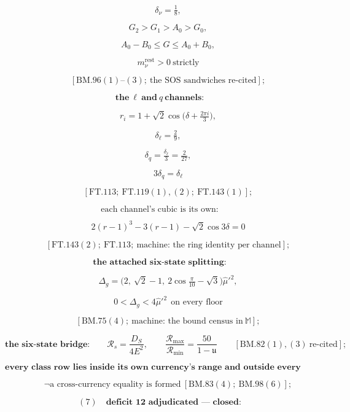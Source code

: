 \documentclass[11pt,openany]{report}
\theoremstyle{canonplain}
\theoremstyle{canondef}
\begin{document}
\[
\qquad \delta_\nu=\tfrac18,
\]

\[
\qquad G_2>G_1>A_0>G_0,
\]

\[
\qquad A_0-B_0\le G\le A_0+B_0,
\]

\[
\qquad m_\nu^{\mathrm{rest}}>0\ \text{strictly}
\]

\[
\qquad [\mathrm{BM.96}(1)\text{--}(3);\ \text{the SOS sandwiches re-cited}];
\]

\[
\textbf{the}\ \ell\ \textbf{and}\ q\ \textbf{channels:}
\]

\[
\qquad r_i=1+\sqrt2\cos\bigl(\delta+\tfrac{2\pi i}3\bigr),
\]

\[
\qquad \delta_\ell=\tfrac29,
\]

\[
\qquad \delta_q=\tfrac{\delta_\ell}3=\tfrac{2}{27},
\]

\[
\qquad 3\delta_q=\delta_\ell
\]

\[
\qquad [\mathrm{FT.113};\ \mathrm{FT.119}(1),(2);\ \mathrm{FT.143}(1)];
\]

\[
\text{each channel's cubic is its own:}
\]

\[
\qquad 2(r-1)^3-3(r-1)-\sqrt2\cos3\delta=0
\]

\[
\qquad [\mathrm{FT.143}(2);\ \mathrm{FT.113};\ \text{machine: the ring identity per channel}];
\]

\[
\textbf{the attached six-state splitting:}
\]

\[
\qquad \Delta_g=\bigl(2,\ \sqrt2-1,\ 2\cos\tfrac\pi{10}-\sqrt3\bigr)\hat\mu'^2,
\]

\[
\qquad 0<\Delta_g<4\hat\mu'^2\ \ \text{on every floor}
\]

\[
\qquad [\mathrm{BM.75}(4);\ \text{machine: the bound census in}\ \mathbb M];
\]

\[
\textbf{the six-state bridge:}\qquad\mathcal R_s=\frac{D_S}{4E^2},\qquad\frac{\mathcal R_{\max}}{\mathcal R_{\min}}=\frac{50}{1-\mathfrak u}\qquad[\mathrm{BM.82}(1),(3)\ \text{re-cited}];
\]

\[
\textbf{every class row lies inside its own currency's range and outside every other's identification:}
\]

\[
\qquad \neg\text{a cross-currency equality is formed}\ [\mathrm{BM.83}(4);\ \mathrm{BM.98}(6)];
\]

\[
(7)\quad\textbf{deficit 12 adjudicated — closed:}
\]
\end{document}
